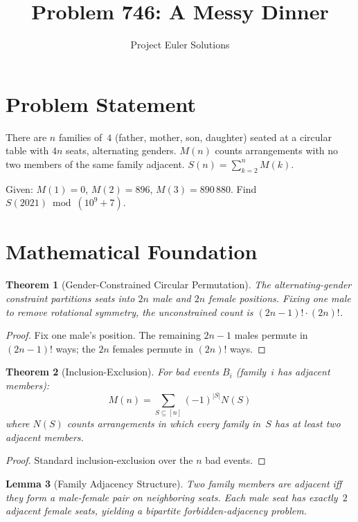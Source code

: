 \documentclass[11pt]{article}
\title{Problem 746: A Messy Dinner}
\author{Project Euler Solutions}
\date{}
\newtheorem{theorem}{Theorem}
\newtheorem{lemma}[theorem]{Lemma}
\theoremstyle{definition}
\begin{document}
\maketitle

\section{Problem Statement}

There are $n$ families of~$4$ (father, mother, son, daughter) seated at a circular table with $4n$ seats, alternating genders. $M(n)$ counts arrangements with no two members of the same family adjacent. $S(n) = \sum_{k=2}^{n} M(k)$.

Given: $M(1)=0$, $M(2)=896$, $M(3)=890\,880$. Find $S(2021) \bmod (10^9+7)$.

\section{Mathematical Foundation}

\begin{theorem}[Gender-Constrained Circular Permutation]
The alternating-gender constraint partitions seats into $2n$ male and $2n$ female positions. Fixing one male to remove rotational symmetry, the unconstrained count is $(2n-1)!\cdot(2n)!$.
\end{theorem}

\begin{proof}
Fix one male's position. The remaining $2n-1$ males permute in $(2n-1)!$ ways; the $2n$ females permute in $(2n)!$ ways.
\end{proof}

\begin{theorem}[Inclusion-Exclusion]
For bad events $B_i$ (family~$i$ has adjacent members):
\[
M(n) = \sum_{S \subseteq [n]} (-1)^{|S|} N(S)
\]
where $N(S)$ counts arrangements in which every family in~$S$ has at least two adjacent members.
\end{theorem}

\begin{proof}
Standard inclusion-exclusion over the $n$ bad events.
\end{proof}

\begin{lemma}[Family Adjacency Structure]
Two family members are adjacent iff they form a male-female pair on neighboring seats. Each male seat has exactly~$2$ adjacent female seats, yielding a bipartite forbidden-adjacency problem.
\end{lemma}
\end{document}
